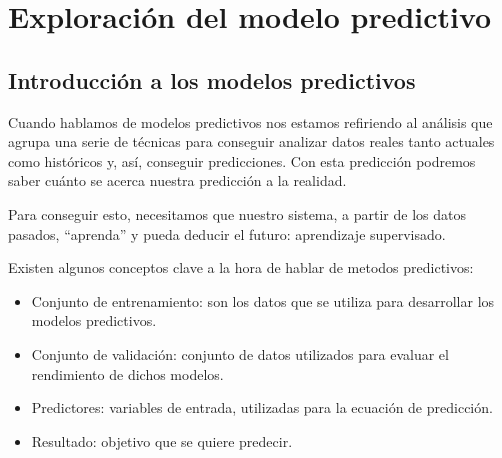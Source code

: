 \cleardoublepage

\chapter{Exploración del modelo predictivo}
\label{makereference4}

\section{Introducción a los modelos predictivos}
\label{makereference4.1}

Cuando hablamos de modelos predictivos nos estamos refiriendo al análisis que agrupa una serie de técnicas para conseguir analizar datos reales tanto actuales como históricos y, así, conseguir predicciones. Con esta predicción podremos saber cuánto se acerca nuestra predicción a la realidad.

Para conseguir esto, necesitamos que nuestro sistema, a partir de los datos pasados, ``aprenda'' y pueda deducir el futuro: aprendizaje supervisado.

Existen algunos conceptos clave a la hora de hablar de metodos predictivos:
\begin{itemize}
	\item Conjunto de entrenamiento: son los datos que se utiliza para desarrollar los modelos predictivos.
	\item Conjunto de validación: conjunto de datos utilizados para evaluar el rendimiento de dichos modelos.
	\item Predictores: variables de entrada, utilizadas para la ecuación de predicción. 
	\item Resultado: objetivo que se quiere predecir.
\end{itemize}

